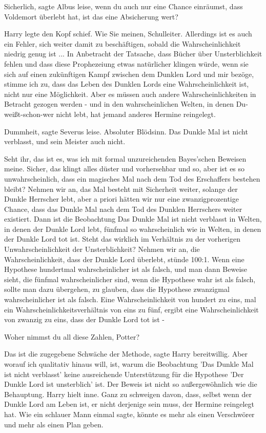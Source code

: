 \glqq{}Sicherlich\grqq{}, sagte Albus leise, \glqq{}wenn du auch nur eine Chance
einräumst, dass Voldemort überlebt hat, ist das eine Absicherung wert?\grqq{}

Harry legte den Kopf schief. \glqq{}Wie Sie meinen, Schulleiter. Allerdings ist
es auch ein Fehler, sich weiter damit zu beschäftigen, sobald die
Wahrscheinlichkeit niedrig genug ist ... In Anbetracht der Tatsache, dass Bücher
über Unsterblichkeit fehlen und dass diese Prophezeiung etwas natürlicher
klingen würde, wenn sie sich auf einen zukünftigen Kampf zwischen dem Dunklen
Lord und mir bezöge, stimme ich zu, dass das Leben des Dunklen Lords eine
Wahrscheinlichkeit ist, nicht nur eine Möglichkeit. Aber es müssen auch andere
Wahrscheinlichkeiten in Betracht gezogen werden - und in den wahrscheinlichen
Welten, in denen Du-weißt-schon-wer nicht lebt, hat jemand anderes Hermine
reingelegt.\grqq{}

\glqq{}Dummheit\grqq{}, sagte Severus leise. \glqq{}Absoluter Blödsinn. Das Dunkle
Mal ist nicht verblasst, und sein Meister auch nicht.\grqq{}

\glqq{}Seht ihr, das ist es, was ich mit formal unzureichenden Bayes'schen
Beweisen meine. Sicher, das klingt alles düster und vorhersehbar und so, aber
ist es so unwahrscheinlich, dass ein magisches Mal nach dem Tod des Erschaffers
bestehen bleibt? Nehmen wir an, das Mal besteht mit Sicherheit weiter, solange
der Dunkle Herrscher lebt, aber a priori hätten wir nur eine zwanzigprozentige
Chance, dass das Dunkle Mal nach dem Tod des Dunklen Herrschers weiter
existiert. Dann ist die Beobachtung \glqq{}Das Dunkle Mal ist nicht
verblasst\grqq{} in Welten, in denen der Dunkle Lord lebt, fünfmal so
wahrscheinlich wie in Welten, in denen der Dunkle Lord tot ist. Steht das
wirklich im Verhältnis zu der vorherigen Unwahrscheinlichkeit der
Unsterblichkeit? Nehmen wir an, die Wahrscheinlichkeit, dass der Dunkle Lord
überlebt, stünde 100:1. Wenn eine Hypothese hundertmal wahrscheinlicher ist als
falsch, und man dann Beweise sieht, die fünfmal wahrscheinlicher sind, wenn die
Hypothese wahr ist als falsch, sollte man dazu übergehen, zu glauben, dass die
Hypothese zwanzigmal wahrscheinlicher ist als falsch. Eine Wahrscheinlichkeit
von hundert zu eins, mal ein Wahrscheinlichkeitsverhältnis von eins zu fünf,
ergibt eine Wahrscheinlichkeit von zwanzig zu eins, dass der Dunkle Lord tot ist
-\grqq{}

\glqq{}Woher nimmst du all diese Zahlen, Potter?\grqq{}

\glqq{}Das ist die zugegebene Schwäche der Methode\grqq{}, sagte Harry
bereitwillig. \glqq{}Aber worauf ich qualitativ hinaus will, ist, warum die
Beobachtung 'Das Dunkle Mal ist nicht verblasst' keine ausreichende
Unterstützung für die Hypothese 'Der Dunkle Lord ist unsterblich' ist. Der
Beweis ist nicht so außergewöhnlich wie die Behauptung.\grqq{} Harry hielt inne.
\glqq{}Ganz zu schweigen davon, dass, selbst wenn der Dunkle Lord am Leben ist,
er nicht derjenige sein muss, der Hermine reingelegt hat. Wie ein schlauer Mann
einmal sagte, könnte es mehr als einen Verschwörer und mehr als einen Plan
geben.\grqq{}

